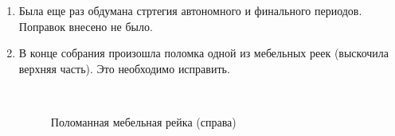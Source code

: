 \begin{enumerate}
\begin{enumerate}
      \item Была еще раз обдумана стртегия автономного и финального периодов. Поправок внесено не было.\newline
      
      \item В конце собрания произошла поломка одной из мебельных реек (выскочила верхняя часть). Это необходимо исправить.\newline
      
      \begin{figure}[H]
      	\begin{minipage}[h]{0.2\linewidth}
      		\center   
      	\end{minipage}
      	\begin{minipage}[h]{0.6\linewidth}
      		\caption{Поломанная мебельная рейка (справа)}
      	\end{minipage}
      \end{figure}
      

\end{enumerate}
\end{enumerate}
